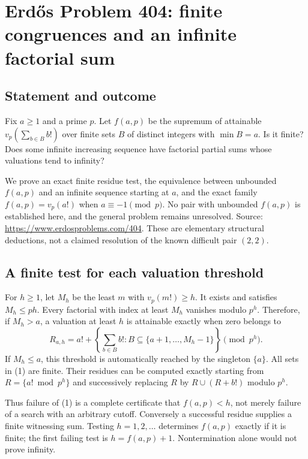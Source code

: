 \section*{Erd\H{o}s Problem 404: finite congruences and an infinite factorial sum}
\subsection*{Statement and outcome}
Fix $a\ge1$ and a prime $p$. Let $f(a,p)$ be the supremum of attainable $v_p(\sum_{b\in B}b!)$ over finite sets $B$ of distinct integers with $\min B=a$. Is it finite? Does some infinite increasing sequence have factorial partial sums whose valuations tend to infinity?

We prove an exact finite residue test, the equivalence between unbounded $f(a,p)$ and an infinite sequence starting at $a$, and the exact family $f(a,p)=v_p(a!)$ when $a\equiv-1\pmod p$. No pair with unbounded $f(a,p)$ is established here, and the general problem remains unresolved. Source: \url{https://www.erdosproblems.com/404}. These are elementary structural deductions, not a claimed resolution of the known difficult pair $(2,2)$.

\subsection*{A finite test for each valuation threshold}
For $h\ge1$, let $M_h$ be the least $m$ with $v_p(m!)\ge h$. It exists and satisfies $M_h\le ph$. Every factorial with index at least $M_h$ vanishes modulo $p^h$. Therefore, if $M_h>a$, a valuation at least $h$ is attainable exactly when zero belongs to
\[
 R_{a,h}=a!+\left\{\sum_{b\in B}b!:
        B\subseteq\{a+1,\ldots,M_h-1\}\right\}\pmod{p^h}. \tag{1}
\]
If $M_h\le a$, this threshold is automatically reached by the singleton $\{a\}$. All sets in (1) are finite. Their residues can be computed exactly starting from $R=\{a!\bmod p^h\}$ and successively replacing $R$ by $R\cup(R+b!)$ modulo $p^h$.

Thus failure of (1) is a complete certificate that $f(a,p)<h$, not merely failure of a search with an arbitrary cutoff. Conversely a successful residue supplies a finite witnessing sum. Testing $h=1,2,\ldots$ determines $f(a,p)$ exactly if it is finite; the first failing test is $h=f(a,p)+1$. Nontermination alone would not prove infinity.

